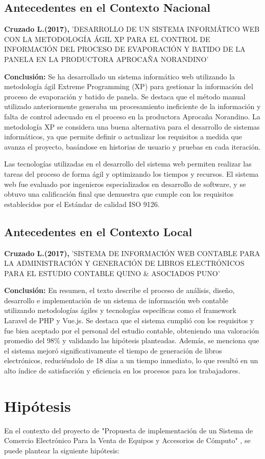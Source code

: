 \documentclass[12pt,a4paper]{article}
\newcommand{\espacio}{\par\vspace{3mm}}
\newcommand{\newsection}[1]{\section{\hspace{4mm} #1}}%
\newcommand{\newsubsection}[1]{\subsection{\hspace{4mm} #1}}
\newcommand{\titulo}{"Propuesta de implementación de un Sistema de Comercio Electrónico Para la Venta de Equipos y Accesorios de Cómputo" }
\begin{document}
\newsubsection{Antecedentes en el Contexto Nacional}
\textbf{Cruzado L.(2017),}
'DESARROLLO DE UN SISTEMA INFORMÁTICO WEB CON LA METODOLOGÍA ÁGIL XP PARA EL CONTROL DE INFORMACIÓN DEL PROCESO DE EVAPORACIÓN Y BATIDO DE LA PANELA EN LA PRODUCTORA APROCAÑA NORANDINO' 
\espacio
\textbf{Conclusión: } 
Se ha desarrollado un sistema informático web utilizando la metodología ágil Extreme Programming (XP) para gestionar la información del proceso de evaporación y batido de panela. Se destaca que el método manual utilizado anteriormente generaba un procesamiento ineficiente de la información y falta de control adecuado en el proceso en la productora Aprocaña Norandino.
La metodología XP se considera una buena alternativa para el desarrollo de sistemas informáticos, ya que permite definir o actualizar los requisitos a medida que avanza el proyecto, basándose en historias de usuario y pruebas en cada iteración.
\espacio
Las tecnologías utilizadas en el desarrollo del sistema web permiten realizar las tareas del proceso de forma ágil y optimizando los tiempos y recursos.
El sistema web fue evaluado por ingenieros especializados en desarrollo de software, y se obtuvo una calificación final que demuestra que cumple con los requisitos establecidos por el Estándar de calidad ISO 9126.
\cite{nacional}

\newsubsection{Antecedentes en el Contexto Local}
\textbf{Cruzado L.(2017),}
'SISTEMA DE INFORMACIÓN WEB CONTABLE PARA LA ADMINISTRACIÓN Y GENERACIÓN DE LIBROS ELECTRÓNICOS PARA EL ESTUDIO CONTABLE QUINO \& ASOCIADOS PUNO'
\espacio
\textbf{Conclusión: } 
En resumen, el texto describe el proceso de análisis, diseño, desarrollo e implementación de un sistema de información web contable utilizando metodologías ágiles y tecnologías específicas como el framework Laravel de PHP y Vue.js. Se destaca que el sistema cumplió con los requisitos y fue bien aceptado por el personal del estudio contable, obteniendo una valoración promedio del 98\% 
y validando las hipótesis planteadas. Además, se menciona que el sistema mejoró significativamente el tiempo de generación de libros electrónicos, reduciéndolo de 18 días a un tiempo inmediato, lo que resultó en un alto índice de satisfacción y eficiencia en los procesos 
para los trabajadores.
\cite{local}


\newpage
\newsection{Hipótesis }

En el contexto del proyecto de \titulo , se puede plantear la siguiente hipótesis:
\espacio
\end{document}
